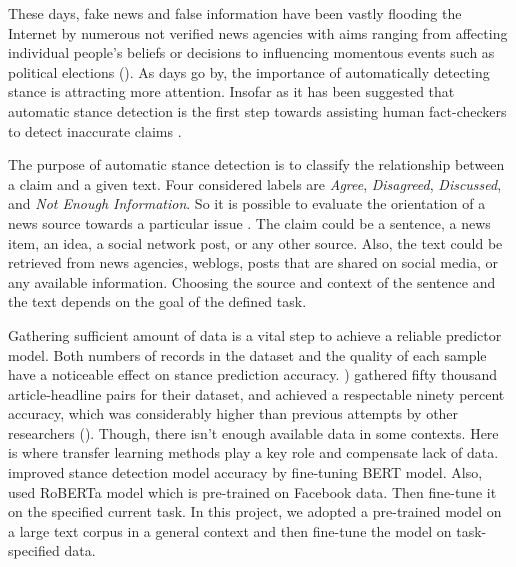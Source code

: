 These days, fake news and false information have been vastly flooding the Internet by numerous not verified news agencies with aims ranging from affecting individual people’s beliefs or decisions to influencing momentous events such as political elections (\cite{memory_network}). As days go by, the importance of automatically detecting stance is attracting more attention. Insofar as it has been suggested that automatic stance detection is the first step towards assisting human fact-checkers to detect inaccurate claims \cite{UCLMR}.



The purpose of automatic stance detection is to classify the relationship between a claim and a given text. Four considered labels are \textit{Agree}, \textit{Disagreed}, \textit{Discussed}, and \textit{Not Enough Information}. So it is possible to evaluate the orientation of a news source towards a particular issue \cite{UCLMR}. The claim could be a sentence, a news item, an idea, a social network post, or any other source. Also, the text could be retrieved from news agencies, weblogs, posts that are shared on social media, or any available information. Choosing the source and context of the sentence and the text depends on the goal of the defined task. 

Gathering sufficient amount of data is a vital step to achieve a reliable predictor model. Both numbers of records in the dataset and the quality of each sample have a noticeable effect on stance prediction accuracy. \cite{takestancefake}) gathered fifty thousand article-headline pairs for their dataset, and achieved a respectable ninety percent accuracy, which was considerably higher than previous attempts by other researchers (\cite{book_fake}). Though, there isn't enough available data in some contexts. Here is where transfer learning methods play a key role and compensate lack of data. \cite{stance_robust} improved stance detection model accuracy by fine-tuning BERT model.
Also, \cite{takestancefake} used RoBERTa model which is pre-trained on Facebook data. Then fine-tune it on the specified current task. In this project, we adopted a pre-trained model on a large text corpus in a general context and then fine-tune the model on task-specified data.

